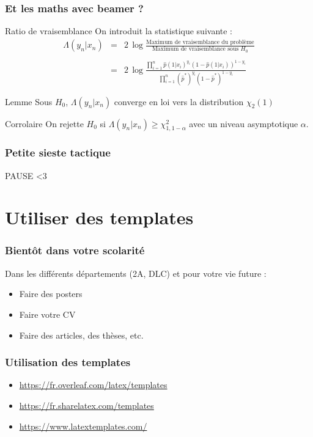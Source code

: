 \documentclass[handout]{beamer}
\begin{document}
\begin{frame}
	\frametitle{Et les maths avec beamer ?}

	\begin{block}{Ratio de vraisemblance}
	    On introduit la statistique suivante :
	    $$
	    \begin{array}{ccl}
	    \Lambda(y_n|x_n) & = & 2\, \log\frac{\mbox{Maximum de vraisemblance du problème}}{\mbox{Maximum de vraisemblance sous } H_0} \\
	    & & \\
	    & = & 2\,\log \frac{\prod_{i=1}^n \hat{p}(1|x_i)^{y_i}(1-\hat{p}(1|x_i))^{1-y_i}}{\prod_{i=1}^n (\hat{p}^*)^{y_i}(1-\hat{p}^*)^{1-y_i}}
	    \end{array}
	    $$
	\end{block}

	\begin{block}{Lemme}
		Sous $H_0$, $\Lambda(y_n|x_n)$ converge en loi vers la distribution $\chi_2(1)$
	\end{block}

	\begin{block}{Corrolaire}
		On rejette $H_0$ si $\Lambda(y_n|x_n) \geq \chi_{1,1-\alpha}^2$ avec un niveau asymptotique $\alpha$.
	\end{block}

\end{frame}

\begin{frame}
	\frametitle{Petite sieste tactique}
	\Huge
	\centering

	PAUSE <3
\end{frame}

\section{Utiliser des templates}

\begin{frame}
	\frametitle{Bientôt dans votre scolarité}
	\centering
	Dans les différents départements (2A, DLC) et pour votre vie future :\\
	\begin{itemize}
		\item Faire des posters
		\item Faire votre CV
		\item Faire des articles, des thèses, etc.
	\end{itemize}
\end{frame}

\begin{frame}
	\frametitle{Utilisation des templates}

	\centering
	\Huge
	\normalsize

	\hspace{2cm}

	\begin{itemize}
		\item \url{https://fr.overleaf.com/latex/templates}
		\item \url{https://fr.sharelatex.com/templates}
		\item \url{https://www.latextemplates.com/}
	\end{itemize}
\end{frame}
\end{document}
